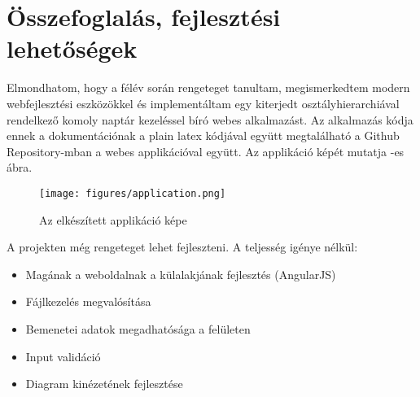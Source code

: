 \chapter{Összefoglalás, fejlesztési lehetőségek}\label{sect:Summary}

\hspace{2mm} Elmondhatom, hogy a félév során rengeteget tanultam, megismerkedtem modern webfejlesztési eszközökkel és implementáltam egy kiterjedt osztályhierarchiával rendelkező komoly naptár kezeléssel bíró webes alkalmazást. Az alkalmazás kódja ennek a dokumentációnak a plain latex kódjával együtt megtalálható a Github Repository-mban \cite{TDoneRepo}  a webes applikációval együtt. \cite{TDoneWeb} Az applikáció képét mutatja -es ábra.

\begin{figure}[!ht]
\centering
\texttt{[image: figures/application.png]}
\caption{Az elkészített applikáció képe} 
\label{fig:App}
\end{figure} 

A projekten még rengeteget lehet fejleszteni. A teljesség igénye nélkül:
\begin{itemize}
\item Magának a weboldalnak a külalakjának fejlesztés (AngularJS)
\item Fájlkezelés megvalósítása
\item Bemenetei adatok megadhatósága a felületen
\item Input validáció
\item Diagram kinézetének fejlesztése
\end{itemize}
